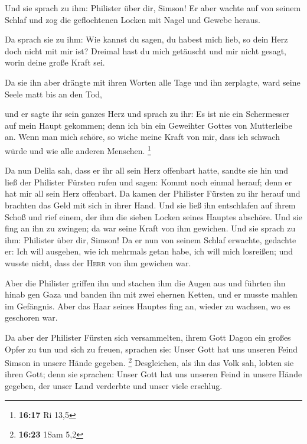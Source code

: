  Und sie sprach zu ihm: Philister über dir, Simson! Er
aber wachte auf von seinem Schlaf und zog die geflochtenen Locken mit
Nagel und Gewebe heraus.

 Da sprach sie zu ihm: Wie kannst du sagen, du habest
mich lieb, so dein Herz doch nicht mit mir ist? Dreimal hast du mich
getäuscht und mir nicht gesagt, worin deine große Kraft sei.

 Da sie ihn aber drängte mit ihren Worten alle Tage und
ihn zerplagte, ward seine Seele matt bis an den Tod,

 und er sagte ihr sein ganzes Herz und sprach zu ihr: Es
ist nie ein Schermesser auf mein Haupt gekommen; denn ich bin ein
Geweihter Gottes von Mutterleibe an. Wenn man mich schöre, so wiche
meine Kraft von mir, dass ich schwach würde und wie alle anderen
Menschen. \footnote{\textbf{16:17} Ri 13,5}

 Da nun Delila sah, dass er ihr all sein Herz offenbart
hatte, sandte sie hin und ließ der Philister Fürsten rufen und sagen:
Kommt noch einmal herauf; denn er hat mir all sein Herz offenbart. Da
kamen der Philister Fürsten zu ihr herauf und brachten das Geld mit sich
in ihrer Hand.  Und sie ließ ihn entschlafen auf ihrem
Schoß und rief einem, der ihm die sieben Locken seines Hauptes abschöre.
Und sie fing an ihn zu zwingen; da war seine Kraft von ihm gewichen.
 Und sie sprach zu ihm: Philister über dir, Simson! Da er
nun von seinem Schlaf erwachte, gedachte er: Ich will ausgehen, wie ich
mehrmals getan habe, ich will mich losreißen; und wusste nicht, dass der
\textsc{Herr} von ihm gewichen war.

 Aber die Philister griffen ihn und stachen ihm die Augen
aus und führten ihn hinab gen Gaza und banden ihn mit zwei ehernen
Ketten, und er musste mahlen im Gefängnis.  Aber das Haar
seines Hauptes fing an, wieder zu wachsen, wo es geschoren war.

 Da aber der Philister Fürsten sich versammelten, ihrem
Gott Dagon ein großes Opfer zu tun und sich zu freuen, sprachen sie:
Unser Gott hat uns unseren Feind Simson in unsere Hände gegeben.
\footnote{\textbf{16:23} 1Sam 5,2}  Desgleichen, als ihn
das Volk sah, lobten sie ihren Gott; denn sie sprachen: Unser Gott hat
uns unseren Feind in unsere Hände gegeben, der unser Land verderbte und
unser viele erschlug.

